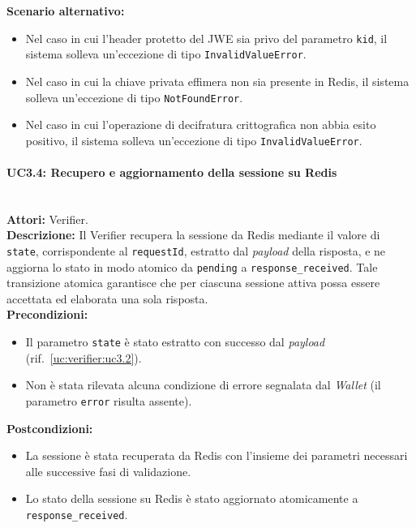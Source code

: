 \noindent\textbf{Scenario alternativo:}
\begin{itemize}
    \item Nel caso in cui l'header protetto del JWE sia privo del parametro \texttt{kid}, il sistema solleva un'eccezione di tipo \texttt{InvalidValueError}.
    \item Nel caso in cui la chiave privata effimera non sia presente in Redis, il sistema solleva un'eccezione di tipo \texttt{NotFoundError}.
    \item Nel caso in cui l'operazione di decifratura crittografica non abbia esito positivo, il sistema solleva un'eccezione di tipo \texttt{InvalidValueError}.
\end{itemize}

\paragraph{\large\bfseries UC3.4: Recupero e aggiornamento della sessione su Redis}
\label{uc:verifier:uc3.4}
\mbox{}\\
\noindent\textbf{Attori:} Verifier.
\\
\noindent\textbf{Descrizione:} Il Verifier recupera la sessione da Redis mediante il valore di \texttt{state}, corrispondente al \texttt{requestId}, estratto dal \textit{payload} della risposta, e ne aggiorna lo stato in modo atomico da \texttt{pending} a \texttt{response\_\allowbreak{}received}. Tale transizione atomica garantisce che per ciascuna sessione attiva possa essere accettata ed elaborata una sola risposta.
\\
\noindent\textbf{Precondizioni:}
\begin{itemize}
    \item Il parametro \texttt{state} è stato estratto con successo dal \textit{payload} (rif.\ \ref{uc:verifier:uc3.2}).
    \item Non è stata rilevata alcuna condizione di errore segnalata dal \textit{Wallet} (il parametro \texttt{error} risulta assente).
\end{itemize}
\noindent\textbf{Postcondizioni:}
\begin{itemize}
    \item La sessione è stata recuperata da Redis con l'insieme dei parametri necessari alle successive fasi di validazione.
    \item Lo stato della sessione su Redis è stato aggiornato atomicamente a \texttt{response\_\allowbreak{}received}.
\end{itemize}

